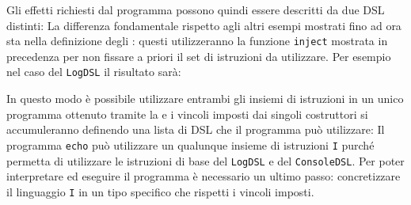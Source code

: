 Gli effetti richiesti dal programma possono quindi essere descritti da due DSL distinti:
La differenza fondamentale rispetto agli altri esempi mostrati fino ad ora sta nella definizione degli : questi utilizzeranno la funzione \lstinline{inject} mostrata in precedenza per non fissare a priori il set di istruzioni da utilizzare. Per esempio nel caso del \lstinline{LogDSL} il risultato sarà:

In questo modo è possibile utilizzare entrambi gli insiemi di istruzioni in un unico programma ottenuto tramite la  e i vincoli imposti dai singoli costruttori si accumuleranno definendo una lista di DSL che il programma può utilizzare:
Il programma \lstinline{echo} può utilizzare un qualunque insieme di istruzioni \lstinline{I} purché permetta di utilizzare le istruzioni di base del \lstinline{LogDSL} e del \lstinline{ConsoleDSL}. Per poter interpretare ed eseguire il programma è necessario un ultimo passo: concretizzare il linguaggio \lstinline{I} in un tipo specifico che rispetti i vincoli imposti.

